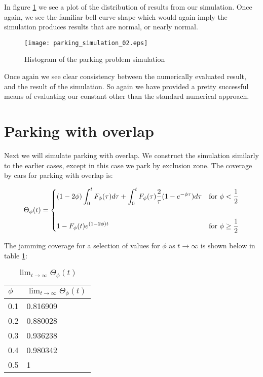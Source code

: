 In figure \ref{fig:ps2} we see a plot of the distribution 
of results from our simulation. Once again, we see the 
familiar bell curve shape which would again imply the 
simulation produces results that are normal, or nearly 
normal. \bigskip

\begin{figure}[h!]
	\centering
	\texttt{[image: parking\_simulation\_02.eps]}
	\caption{Histogram of the parking problem simulation}
	\label{fig:ps2}
\end{figure}\medskip

Once again we see clear consistency between the numerically 
evaluated result, and the result of the simulation. So again 
we have provided a pretty successful means of evaluating our 
constant other than the standard numerical approach. \bigskip








\section{Parking with overlap}

Next we will simulate parking with overlap. We construct 
the simulation similarly to the earlier cases, except 
in this case we park by exclusion zone. The coverage by 
cars for parking with overlap is: \bigskip

\begin{eqnarray*}
	\Theta_{\phi}(t) = 
	\begin{dcases}
		(1 - 2 \phi) \int_{0}^{t} F_{\phi}(\tau) d \tau  + \int_{0}^{t} F_{\phi}(\tau) \frac{2}{\tau} (1 - e^{-\phi \tau}) d \tau			& \text{for } \phi < \frac{1}{2} \\\\
		1 - F_{\phi}(t) e^{(1 - 2 \phi)t}																									& \text{for } \phi \geq \frac{1}{2} 
	\end{dcases}
\end{eqnarray*}\medskip

The jamming coverage for a selection of values for $\phi$ 
as $t \to \infty$ is shown below in table \ref{table:2}: \bigskip

\begin{table}[h!]
	\centering
	\begin{tabular}{|l | l|} 
		\hline
		$\phi$ & $\lim_{t \to \infty} \Theta_{\phi}(t)$ \\ [1ex] 
		\hline
		0.1 & 0.816909 \\ 
		0.2 & 0.880028 \\ 
		0.3 & 0.936238 \\ 
		0.4 & 0.980342 \\ 
		0.5 & 1 \\ 
		\hline
	\end{tabular}
	\caption{$\lim_{t \to \infty} \Theta_{\phi}(t)$}
	\label{table:2}
\end{table}\medskip


